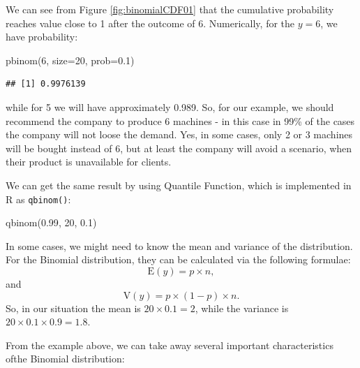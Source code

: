 \documentclass[
]{book}
\newenvironment{Shaded}{\begin{snugshade}}{\end{snugshade}}
\newcommand{\AttributeTok}[1]{\textcolor[rgb]{0.77,0.63,0.00}{#1}}
\newcommand{\DecValTok}[1]{\textcolor[rgb]{0.00,0.00,0.81}{#1}}
\newcommand{\FloatTok}[1]{\textcolor[rgb]{0.00,0.00,0.81}{#1}}
\newcommand{\FunctionTok}[1]{\textcolor[rgb]{0.00,0.00,0.00}{#1}}
\newcommand{\NormalTok}[1]{#1}
\theoremstyle{definition}
\theoremstyle{definition}
\theoremstyle{definition}
\theoremstyle{definition}
\theoremstyle{remark}
\begin{document}
We can see from Figure \ref{fig:binomialCDF01} that the cumulative probability reaches value close to 1 after the outcome of 6. Numerically, for the \(y=6\), we have probability:

\begin{Shaded}
\begin{Highlighting}[]
\FunctionTok{pbinom}\NormalTok{(}\DecValTok{6}\NormalTok{, }\AttributeTok{size=}\DecValTok{20}\NormalTok{, }\AttributeTok{prob=}\FloatTok{0.1}\NormalTok{)}
\end{Highlighting}
\end{Shaded}

\begin{verbatim}
## [1] 0.9976139
\end{verbatim}

while for 5 we will have approximately 0.989. So, for our example, we should recommend the company to produce 6 machines - in this case in 99\% of the cases the company will not loose the demand. Yes, in some cases, only 2 or 3 machines will be bought instead of 6, but at least the company will avoid a scenario, when their product is unavailable for clients.

We can get the same result by using Quantile Function, which is implemented in R as \texttt{qbinom()}:

\begin{Shaded}
\begin{Highlighting}[]
\FunctionTok{qbinom}\NormalTok{(}\FloatTok{0.99}\NormalTok{, }\DecValTok{20}\NormalTok{, }\FloatTok{0.1}\NormalTok{)}
\end{Highlighting}
\end{Shaded}

In some cases, we might need to know the mean and variance of the distribution. For the Binomial distribution, they can be calculated via the following formulae:
\begin{equation}
    \mathrm{E}(y) = p \times n ,
    \label{eq:BinomialMean}
\end{equation}
and
\begin{equation}
    \mathrm{V}(y) = p \times (1-p) \times n .
    \label{eq:BinomialVariance}
\end{equation}
So, in our situation the mean is \(20 \times 0.1 = 2\), while the variance is \(20 \times 0.1 \times 0.9 = 1.8\).

From the example above, we can take away several important characteristics ofthe Binomial distribution:
\end{document}
